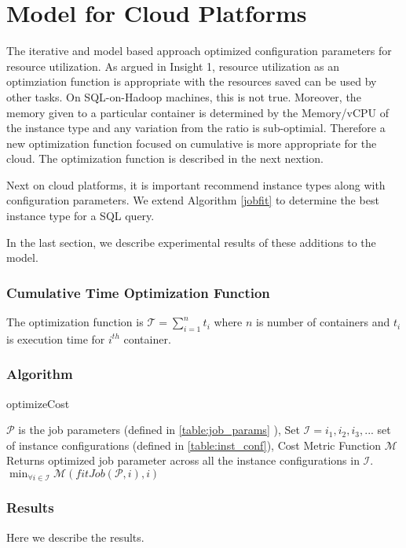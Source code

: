 \section{Model for Cloud Platforms}
The iterative and model based approach optimized configuration parameters for resource utilization. As argued in Insight 1, 
resource utilization as an optimziation function is appropriate with the resources saved can be used by other tasks. On SQL-on-Hadoop
machines, this is not true. Moreover, the memory given to a particular container is determined by the Memory/vCPU of the instance type 
and any variation from the ratio is sub-optimial. Therefore a new optimization function focused on cumulative is more appropriate for the cloud.
The optimization function is described in the next nextion.

Next on cloud platforms, it is important recommend instance types along with configuration parameters. We extend Algorithm \ref{jobfit} to determine
the best instance type for a SQL query.

In the last section, we describe experimental results of these additions to the model.

\noindent\subsubsection*{Cumulative Time Optimization Function}
The optimization function is 
$\mathcal{T} = \sum_{i=1}^{n} t_i$ where $n$ is number of containers and $t_i$ is execution time for $i^{th}$ container. 

\noindent\subsubsection*{Algorithm}

\begin{algorithm}
\caption{optimizeCost} \label{cost_optimize}
\begin{algorithmic}[1]
\footnotesize
\REQUIRE $\mathcal{P}$ is the job parameters (defined in \ref{table:job_params} ), Set $\mathcal{I} = {i_1, i_2, i_3, ...} $ set of instance configurations (defined in \ref{table:inst_conf}), Cost Metric Function $\mathcal{M}$
\ENSURE Returns optimized job parameter across all the instance configurations in $\mathcal{I}$.
\RETURN $\min_{\forall i \in \mathcal{I}} \mathcal{M}(fitJob(\mathcal{P}, i), i)$
\end{algorithmic}
\end{algorithm}

\noindent\subsubsection*{Results}

Here we describe the results. 
